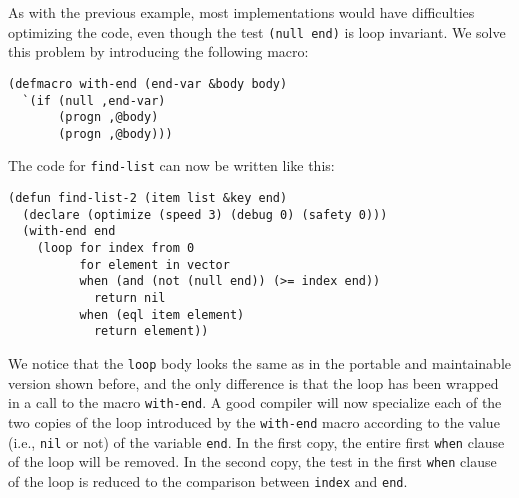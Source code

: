As with the previous example, most \commonlisp{} implementations would
have difficulties optimizing the code, even though the test
\texttt{(null end)} is loop invariant.  We solve this problem by
introducing the following macro:

{\small\begin{verbatim}
(defmacro with-end (end-var &body body)
  `(if (null ,end-var)
       (progn ,@body)
       (progn ,@body)))
\end{verbatim}}

The code for \texttt{find-list} can now be written like this:

{\small\begin{verbatim}
(defun find-list-2 (item list &key end)
  (declare (optimize (speed 3) (debug 0) (safety 0)))
  (with-end end
    (loop for index from 0
          for element in vector
          when (and (not (null end)) (>= index end))
            return nil
          when (eql item element)
            return element))
\end{verbatim}}

We notice that the \texttt{loop} body looks the same as in the
portable and maintainable version shown before, and the only
difference is that the loop has been wrapped in a call to the macro
\texttt{with-end}.  A good compiler will now specialize each of the
two copies of the loop introduced by the \texttt{with-end} macro
according to the value (i.e., \texttt{nil} or not) of the variable
\texttt{end}.  In the first copy, the entire first \texttt{when}
clause of the loop will be removed.  In the second copy, the test in
the first \texttt{when} clause of the loop is reduced to the
comparison between \texttt{index} and \texttt{end}.
